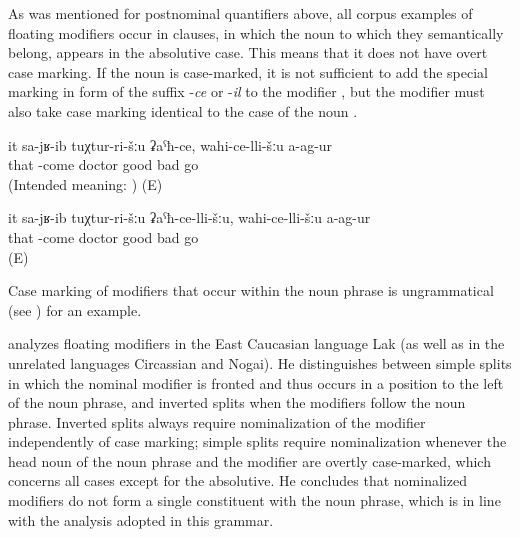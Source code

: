 As was mentioned for postnominal quantifiers above, all corpus examples of floating modifiers occur in clauses, in which the noun to which they semantically belong, appears in the absolutive case. This means that it does not have overt case marking. If the noun is case-marked, it is not sufficient to add the special marking in form of the suffix -\textit{ce} or -\textit{il} to the modifier , but the modifier must also take case marking identical to the case of the noun .

\begin{exe}
	\ex	\label{ex:He went to a good doctor, he did not go to a bad one ungrammatical minor2}
	\gll	{*}	it	sa-jʁ-ib	tuχtur-ri-šːu ʡaˁħ-ce,	wahi-ce-lli-šːu	a-ag-ur\\
		{}	that	-come	doctor good	bad	go\\
	\glt	(Intended meaning: ) (E)

	\ex	\label{ex:He went to a doctor who is good; he did not go to a bad one minor2}
	\gll	it	sa-jʁ-ib	tuχtur-ri-šːu ʡaˁħ-ce-lli-šːu,	wahi-ce-lli-šːu	a-ag-ur\\
		that	-come	doctor good	bad	go\\
	\glt	{} (E)
\end{exe}

Case marking of modifiers that occur within the noun phrase is ungrammatical (see ) for an example.

\citet{Kazenin2009} analyzes floating modifiers in the East Caucasian language Lak (as well as in the unrelated languages Circassian and Nogai). He distinguishes between simple splits in which the nominal modifier is fronted and thus occurs in a position to the left of the noun phrase, and inverted splits when the modifiers follow the noun phrase. Inverted splits always require nominalization of the modifier independently of case marking; simple splits require nominalization whenever the head noun of the noun phrase and the modifier are overtly case-marked, which concerns all cases except for the absolutive. He concludes that nominalized modifiers do not form a single constituent with the noun phrase, which is in line with the analysis adopted in this grammar.

